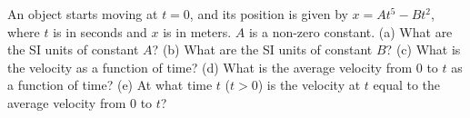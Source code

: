 An object starts moving at $t = 0$, and its position is given by $x =
A t^5 - B t^2$, where $t$ is in seconds and $x$ is in meters. $A$ is
a non-zero constant.
%
(a) What are the SI units of constant $A$?\answercheck\hwendpart
%
(b) What are the SI units of constant $B$?\answercheck\hwendpart
%
(c) What is the velocity as a function of time?\answercheck\hwendpart
%
(d) What is the average velocity from $0$ to $t$ as a function of
time?\answercheck\hwendpart
%
(e) At what time $t$ ($t > 0$) is the velocity at $t$
equal to the average velocity from $0$ to $t$?\answercheck
